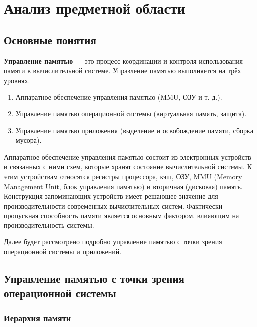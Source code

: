 \chapter{Анализ предметной области}

\section{Основные понятия}

\textbf{Управление памятью} \cite{glossary} --- это процесс координации и контроля использования памяти в вычислительной системе. Управление памятью выполняется на трёх уровнях. 

\begin{enumerate}[label*=\arabic*.]
	\item Аппаратное обеспечение управления памятью (MMU, ОЗУ и т. д.).
	\item Управление памятью операционной системы (виртуальная память, защита).
	\item Управление памятью приложения (выделение и освобождение памяти, сборка мусора).
\end{enumerate}

Аппаратное обеспечение управления памятью состоит из электронных устройств и связанных с ними схем, которые хранят состояние вычислительной системы. К этим устройствам относятся регистры процессора, кэш, ОЗУ, MMU (Memory Management Unit, блок управления памятью) и вторичная (дисковая) память. Конструкция запоминающих устройств имеет решающее значение для производительности современных вычислительных систем. Фактически пропускная способность памяти является основным фактором, влияющим на производительность системы. \cite{glossary}

Далее будет рассмотрено подробно управление памятью с точки зрения операционной системы и приложений.



\clearpage
\section{Управление памятью с точки зрения операционной системы}

\subsection{Иерархия памяти}

